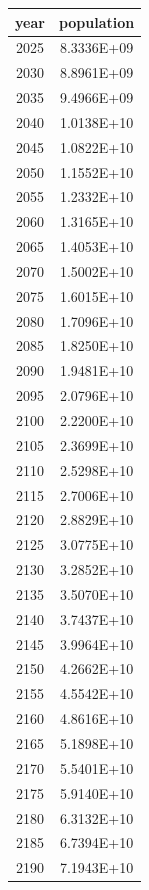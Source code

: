 \documentclass[a4paper]{article}
\begin{document}
	\noindent
	\begin{tabular}{|c|c|}
		\hline
		year & population \\
		\hline
		2025 & 8.3336E+09 \\
		\hline
		2030 & 8.8961E+09 \\
		\hline
		2035 & 9.4966E+09 \\
		\hline
		2040 & 1.0138E+10 \\
		\hline
		2045 & 1.0822E+10 \\
		\hline
		2050 & 1.1552E+10 \\
		\hline
		2055 & 1.2332E+10 \\
		\hline
		2060 & 1.3165E+10 \\
		\hline
		2065 & 1.4053E+10 \\
		\hline
		2070 & 1.5002E+10 \\
		\hline
		2075 & 1.6015E+10 \\
		\hline
		2080 & 1.7096E+10 \\
		\hline
		2085 & 1.8250E+10 \\
		\hline
		2090 & 1.9481E+10 \\
		\hline
		2095 & 2.0796E+10 \\
		\hline
		2100 & 2.2200E+10 \\
		\hline
		2105 & 2.3699E+10 \\
		\hline
		2110 & 2.5298E+10 \\
		\hline
		2115 & 2.7006E+10 \\
		\hline
		2120 & 2.8829E+10 \\
		\hline
		2125 & 3.0775E+10 \\
		\hline
		2130 & 3.2852E+10 \\
		\hline
		2135 & 3.5070E+10 \\
		\hline
		2140 & 3.7437E+10 \\
		\hline
		2145 & 3.9964E+10 \\
		\hline
		2150 & 4.2662E+10 \\
		\hline
		2155 & 4.5542E+10 \\
		\hline
		2160 & 4.8616E+10 \\
		\hline
		2165 & 5.1898E+10 \\
		\hline
		2170 & 5.5401E+10 \\
		\hline
		2175 & 5.9140E+10 \\
		\hline
		2180 & 6.3132E+10 \\
		\hline
		2185 & 6.7394E+10 \\
		\hline
		2190 & 7.1943E+10 \\
		\hline

\end{tabular}
\end{document}
